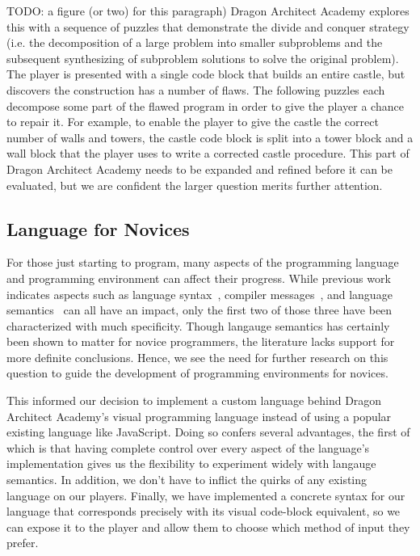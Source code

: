 \documentclass{sig-alternate}
\newcommand{\TODO}[1]{{\color{red} TODO: #1}}
\newcommand{\gametitle}{{\color{RoyalPurple} Dragon Architect Academy}}
\begin{document}
\TODO{a figure (or two) for this paragraph)}
\gametitle{} explores this with a sequence of puzzles that demonstrate the divide and conquer strategy (i.e. the decomposition of a large problem into smaller subproblems and the subsequent synthesizing of subproblem solutions to solve the original problem). 
The player is presented with a single code block that builds an entire castle, but discovers the construction has a number of flaws. 
The following puzzles each decompose some part of the flawed program in order to give the player a chance to repair it. 
For example, to enable the player to give the castle the correct number of walls and towers, the castle code block is split into a tower block and a wall block that the player uses to write a corrected castle procedure. 
This part of \gametitle{} needs to be expanded and refined before it can be evaluated, but we are confident the larger question merits further attention. 

\subsection{Language for Novices}
For those just starting to program, many aspects of the programming language and programming environment can affect their progress. 
While previous work indicates aspects such as language syntax~\cite{stefik2013syntax}, compiler messages~\cite{nienaltowski2008compiler}, and language semantics~\cite{hoc1990language} can all have an impact, only the first two of those three have been characterized with much specificity. 
Though langauge semantics has certainly been shown to matter for novice programmers, the literature lacks support for more definite conclusions. 
Hence, we see the need for further research on this question to guide the development of programming environments for novices.

This informed our decision to implement a custom language behind \gametitle{}'s visual programming language instead of using a popular existing language like JavaScript. 
Doing so confers several advantages, the first of which is that having complete control over every aspect of the language's implementation gives us the flexibility to experiment widely with langauge semantics. 
In addition, we don't have to inflict the quirks of any existing language on our players. 
Finally, we have implemented a concrete syntax for our language that corresponds precisely with its visual code-block equivalent, so we can expose it to the player and allow them to choose which method of input they prefer. 
\end{document}
